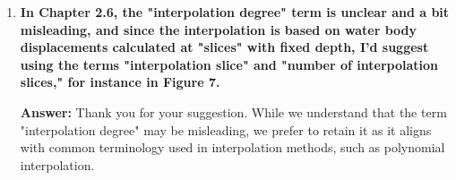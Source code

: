 \documentclass{article}
\newcommand{\answer}[1]{\textbf{\textcolor{answercolor}{Answer:}} \textcolor{answercolor}{#1}}
\begin{document}
\begin{enumerate}[label=\textbf{\arabic*.}]
    \answer{As one of the goals of the paper is to describe a complete unified framework for ocean simulation in real-time, we think that presenting alternative approaches can only benefit the reader. Additionally, it makes the article more self-contained on the subject of ocean simulation.}

    \item \textbf{In Chapter 2.6, the "interpolation degree" term is unclear and a bit misleading, and since the interpolation is based on water body displacements calculated at "slices" with fixed depth, I'd suggest using the terms "interpolation slice" and "number of interpolation slices," for instance in Figure 7.}
    
    \answer{Thank you for your suggestion. While we understand that the term "interpolation degree" may be misleading, we prefer to retain it as it aligns with common terminology used in interpolation methods, such as polynomial interpolation.}
\end{enumerate}
\end{document}
